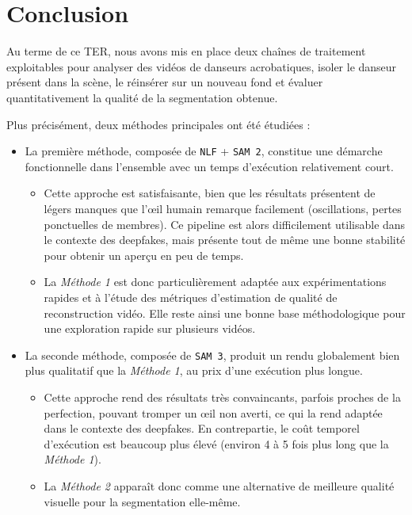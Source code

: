 \documentclass[11pt,a4paper]{article}
\begin{document}
\newpage

\section{Conclusion}
Au terme de ce TER, nous avons mis en place deux chaînes de traitement exploitables pour analyser des vidéos de danseurs acrobatiques, isoler le danseur présent dans la scène, le réinsérer sur un nouveau fond et évaluer quantitativement la qualité de la segmentation obtenue.

Plus précisément, deux méthodes principales ont été étudiées :
\begin{itemize}
    \item La première méthode, composée de \texttt{NLF} + \texttt{SAM 2}, constitue une démarche fonctionnelle dans l'ensemble avec un temps d'exécution relativement court.
    \begin{itemize}
        \item Cette approche est satisfaisante, bien que les résultats présentent de légers manques que l'œil humain remarque facilement (oscillations, pertes ponctuelles de membres). Ce pipeline est alors difficilement utilisable dans le contexte des deepfakes, mais présente tout de même une bonne stabilité pour obtenir un aperçu en peu de temps.
        \item La \textit{Méthode 1} est donc particulièrement adaptée aux expérimentations rapides et à l'étude des métriques d'estimation de qualité de reconstruction vidéo. Elle reste ainsi une bonne base méthodologique pour une exploration rapide sur plusieurs vidéos.
    \end{itemize}
    \item La seconde méthode, composée de \texttt{SAM 3}, produit un rendu globalement bien plus qualitatif que la \textit{Méthode 1}, au prix d'une exécution plus longue.
    \begin{itemize}
        \item Cette approche rend des résultats très convaincants, parfois proches de la perfection, pouvant tromper un œil non averti, ce qui la rend adaptée dans le contexte des deepfakes. En contrepartie, le coût temporel d'exécution est beaucoup plus élevé (environ 4 à 5 fois plus long que la \textit{Méthode 1}).
        \item La \textit{Méthode 2} apparaît donc comme une alternative de meilleure qualité visuelle pour la segmentation elle-même.
    \end{itemize}
\end{itemize}
\end{document}
